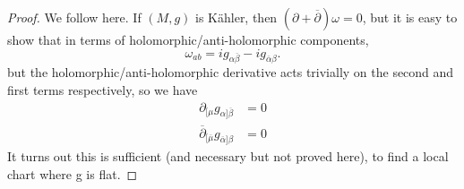 \label{prop:local_kahler}
\begin{proof}
    We follow \citep{Bouchard2007} here.
    If $(M,g)$ is Kähler, then $(\partial + \overline{\partial}) \omega = 0$, but it is easy to show that in terms of holomorphic/anti-holomorphic components,
    \begin{equation}
        \omega_{a b} = i g_{\alpha \overline{\beta}} - i g_{\overline{\alpha} \beta}.
    \end{equation}
    but the holomorphic/anti-holomorphic derivative acts trivially on the second and first terms respectively, so we have
    \begin{align}
        \partial_{[\mu} g_{\alpha] \overline{\beta}} &= 0\\
        \overline{\partial}_{[\overline{\mu}} g_{\overline{\alpha}] \beta} &= 0
    \end{align}
    It turns out this is sufficient (and necessary but not proved here), to find a local chart where g is flat.
\end{proof}
